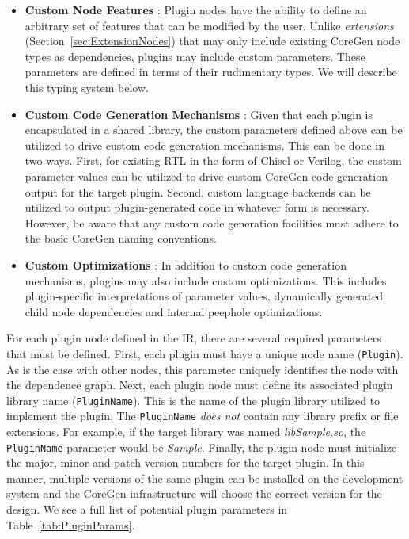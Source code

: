 \documentclass{article}
\begin{document}
\begin{itemize}
\item \textbf{Custom Node Features} : Plugin nodes have the ability to define an arbitrary set of features that 
can be modified by the user.  Unlike \textit{extensions} (Section~\ref{sec:ExtensionNodes}) that may only 
include existing CoreGen node types as dependencies, plugins may include custom parameters.  These 
parameters are defined in terms of their rudimentary types.  We will describe this typing system below.  

\item \textbf{Custom Code Generation Mechanisms} : Given that each plugin is encapsulated in a shared 
library, the custom parameters defined above can be utilized to drive custom code generation mechanisms.  
This can be done in two ways.  First, for existing RTL in the form of Chisel or Verilog, the custom parameter 
values can be utilized to drive custom CoreGen code generation output for the target plugin.  Second, custom 
language backends can be utilized to output plugin-generated code in whatever form is necessary.  However, 
be aware that any custom code generation facilities must adhere to the basic CoreGen naming conventions.  

\item \textbf{Custom Optimizations} : In addition to custom code generation mechanisms, plugins may also 
include custom optimizations.  This includes plugin-specific interpretations of parameter values, dynamically 
generated child node dependencies and internal peephole optimizations.  
\end{itemize}

For each plugin node defined in the IR, there are several required parameters that must be defined.  First, 
each plugin must have a unique node name (\texttt{Plugin}).  As is the case with other nodes, this parameter 
uniquely identifies the node with the dependence graph.  Next, each plugin node must define its associated 
plugin library name (\texttt{PluginName}).  This is the name of the plugin library utilized to implement the plugin.  
The \texttt{PluginName} \textit{does not} contain any library prefix or file extensions.  For example, if the target 
library was named \textit{libSample.so}, the \texttt{PluginName} parameter would be \textit{Sample}.  Finally, 
the plugin node must initialize the major, minor and patch version numbers for the target plugin.  In this manner, 
multiple versions of the same plugin can be installed on the development system and the CoreGen infrastructure 
will choose the correct version for the design.  We see a full list of potential plugin parameters in Table~\ref{tab:PluginParams}.    
\end{document}
